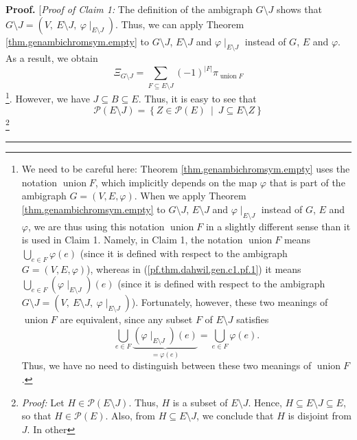 \documentclass[numbers=enddot,12pt,final,onecolumn,notitlepage]{scrartcl}%
\theoremstyle{definition}
\newenvironment{proof}[1][Proof]{\noindent\textbf{#1.} }{\ \rule{0.5em}{0.5em}}
\newenvironment{verlong}{}{}
\let\sumnonlimits\sum
\let\bigcupnonlimits\bigcup
\renewcommand{\sum}{\sumnonlimits\limits}
\renewcommand{\bigcup}{\bigcupnonlimits\limits}
\begin{document}
\begin{proof}
\begin{verlong}
[\textit{Proof of Claim 1:} The definition of the ambigraph $G\setminus J$
shows that $G\setminus J=\left(  V,\ E\setminus J,\ \varphi\mid_{E\setminus
J}\right)  $. Thus, we can apply Theorem \ref{thm.genambichromsym.empty} to
$G\setminus J$, $E\setminus J$ and $\varphi\mid_{E\setminus J}$ instead of
$G$, $E$ and $\varphi$. As a result, we obtain%
\begin{equation}
\Xi_{G\setminus J}=\sum_{F\subseteq E\setminus J}\left(  -1\right)
^{\left\vert F\right\vert }\pi_{\operatorname*{union}F}
\label{pf.thm.dahwil.gen.c1.pf.1}%
\end{equation}
\footnote{We need to be careful here: Theorem \ref{thm.genambichromsym.empty}
uses the notation $\operatorname*{union}F$, which implicitly depends on the
map $\varphi$ that is part of the ambigraph $G=\left(  V,E,\varphi\right)  $.
When we apply Theorem \ref{thm.genambichromsym.empty} to $G\setminus J$,
$E\setminus J$ and $\varphi\mid_{E\setminus J}$ instead of $G$, $E$ and
$\varphi$, we are thus using this notation $\operatorname*{union}F$ in a
slightly different sense than it is used in Claim 1. Namely, in Claim 1, the
notation $\operatorname*{union}F$ means $\bigcup_{e\in F}\varphi\left(
e\right)  $ (since it is defined with respect to the ambigraph $G=\left(
V,E,\varphi\right)  $), whereas in (\ref{pf.thm.dahwil.gen.c1.pf.1}) it means
$\bigcup_{e\in F}\left(  \varphi\mid_{E\setminus J}\right)  \left(  e\right)
$ (since it is defined with respect to the ambigraph $G\setminus J=\left(
V,\ E\setminus J,\ \varphi\mid_{E\setminus J}\right)  $). Fortunately,
however, these two meanings of $\operatorname*{union}F$ are equivalent, since
any subset $F$ of $E\setminus J$ satisfies%
\[
\bigcup_{e\in F}\underbrace{\left(  \varphi\mid_{E\setminus J}\right)  \left(
e\right)  }_{=\varphi\left(  e\right)  }=\bigcup_{e\in F}\varphi\left(
e\right)  .
\]
Thus, we have no need to distinguish between these two meanings of
$\operatorname*{union}F$.}. However, we have $J\subseteq B\subseteq E$. Thus,
it is easy to see that
\begin{equation}
\mathcal{P}\left(  E\setminus J\right)  =\left\{  Z\in\mathcal{P}\left(
E\right)  \ \mid\ J\subseteq E\setminus Z\right\}
\label{pf.thm.dahwil.gen.c1.pf.2}%
\end{equation}
\footnote{\textit{Proof:} Let $H\in\mathcal{P}\left(  E\setminus J\right)  $.
Thus, $H$ is a subset of $E\setminus J$. Hence, $H\subseteq E\setminus
J\subseteq E$, so that $H\in\mathcal{P}\left(  E\right)  $. Also, from
$H\subseteq E\setminus J$, we conclude that $H$ is disjoint from $J$. In other
}
\end{verlong}
\end{proof}
\end{document}
